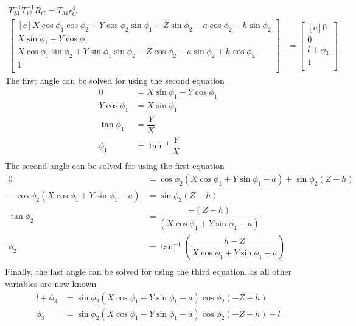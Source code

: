 \documentclass[onecolumn,10pt]{jhwhw}
\begin{document}
\begin{align*}
T_{23}^{-1} T_{12}^{-1} R_C = T_{34} r_C^4 \\
\begin{bmatrix*}[c]
X \cos \phi_1 \cos \phi_2 + Y \cos \phi_2 \sin \phi_1 + Z \sin \phi_2 - a \cos \phi_2 - h \sin \phi_2 \\
                                                                        X \sin \phi_1 - Y \cos \phi_1 \\
X \cos \phi_1 \sin \phi_2 + Y \sin \phi_1 \sin \phi_2 - Z \cos \phi_2 - a \sin \phi_2 + h \cos \phi_2 \\
                                                                                                    1 \\
\end{bmatrix*} &=
\begin{bmatrix*}[c]
       0 \\
       0 \\
l + \phi_3 \\
       1 \\
\end{bmatrix*}
\end{align*}
The first angle can be solved for using the second equation
\begin{align*}
0 &= X \sin \phi_1 - Y \cos \phi_1 \\
Y \cos \phi_1 &= X \sin \phi_1 \\
\tan \phi_1 &= \dfrac{Y}{X} \\
\phi_1 &= \tan^{-1} \dfrac{Y}{X} \\
\end{align*}
The second angle can be solved for using the first equation
\begin{align*}
0 &= \cos \phi_2 \left(X \cos \phi_1 + Y \sin \phi_1 - a \right) + \sin \phi_2 \left(Z  - h \right) \\
-\cos \phi_2 \left(X \cos \phi_1 + Y \sin \phi_1 - a \right) &= \sin \phi_2 \left(Z  - h \right) \\
\tan \phi_2 &= \dfrac{-\left(Z  - h \right)}{\left(X \cos \phi_1 + Y \sin \phi_1 - a \right)} \\
\phi_2 &= \tan^{-1} \left( \dfrac{h - Z}{X \cos \phi_1 + Y \sin \phi_1 - a} \right) \\
\end{align*}
Finally, the last angle can be solved for using the third equation, as all other variables are now known
\begin{align*}
l + \phi_3 &= \sin \phi_2 \left(X \cos \phi_1 + Y \sin \phi_1 - a \right) \cos \phi_2 \left(- Z  + h\right) \\
\phi_3 &= \sin \phi_2 \left(X \cos \phi_1 + Y \sin \phi_1 - a \right) \cos \phi_2 \left(- Z  + h\right) - l \\
\end{align*}
\end{document}
